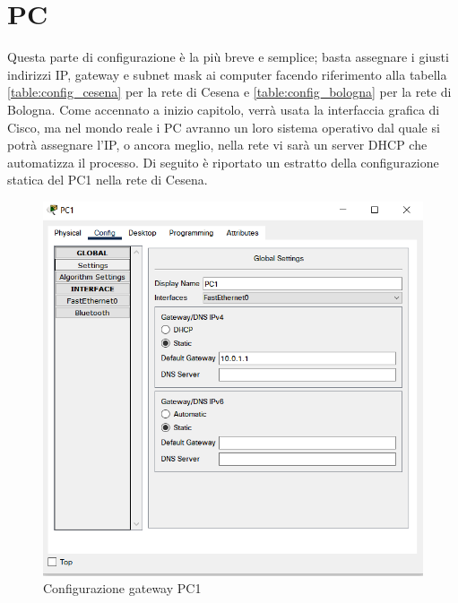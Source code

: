 \documentclass[a4paper,12pt]{report}
\begin{document}
\section{PC}
Questa parte di configurazione è la più breve e semplice; basta assegnare i giusti indirizzi IP, gateway e subnet mask ai computer facendo riferimento alla tabella \ref{table:config_cesena} per la rete di Cesena e \ref{table:config_bologna} per la rete di Bologna.
%
Come accennato a inizio capitolo, verrà usata la interfaccia grafica di Cisco, ma nel mondo reale i PC avranno un loro sistema operativo dal quale si potrà assegnare l'IP, o ancora meglio, nella rete vi sarà un server DHCP che automatizza il processo.
%
Di seguito è riportato un estratto della configurazione statica del PC1 nella rete di Cesena.
\begin{figure}
\includegraphics[]{pc1_gateway_config.png}
\caption{Configurazione gateway PC1}
\label{fig:pc1_gateway_config}
\end{figure}
\end{document}
